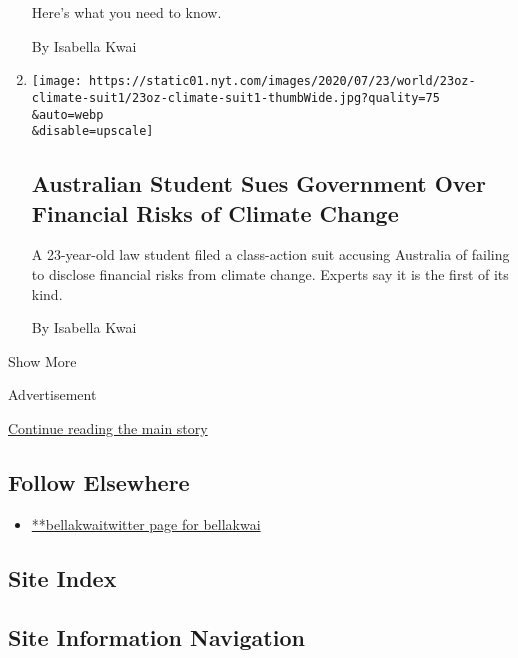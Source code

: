 \begin{enumerate}
  Here's what you need to know.

  By Isabella Kwai
\item
  \href{/2020/07/23/world/australia/lawsuit-climate-change-bonds.html}{}

  \texttt{[image: https://static01.nyt.com/images/2020/07/23/world/23oz-climate-suit1/23oz-climate-suit1-thumbWide.jpg?quality=75\\\&auto=webp\\\&disable=upscale]}

  \hypertarget{australian-student-sues-government-over-financial-risks-of-climate-change}{%
  \subsection{Australian Student Sues Government Over Financial Risks of
  Climate
  Change}\label{australian-student-sues-government-over-financial-risks-of-climate-change}}

  A 23-year-old law student filed a class-action suit accusing Australia
  of failing to disclose financial risks from climate change. Experts
  say it is the first of its kind.

  By Isabella Kwai
\end{enumerate}

Show More

Advertisement

\protect\hyperlink{after-mid2}{Continue reading the main story}

\hypertarget{follow-elsewhere}{%
\subsection{Follow Elsewhere}\label{follow-elsewhere}}

\begin{itemize}
\tightlist
\item
  \href{https://twitter.com/bellakwai}{**bellakwaitwitter page for
  bellakwai}
\end{itemize}

\hypertarget{site-index}{%
\subsection{Site Index}\label{site-index}}

\hypertarget{site-information-navigation}{%
\subsection{Site Information
Navigation}\label{site-information-navigation}}


